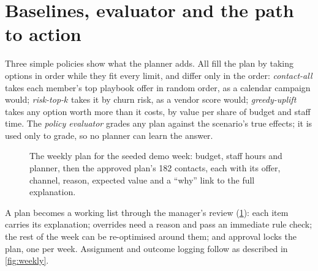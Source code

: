 \section{Baselines, evaluator and the path to action}

Three simple policies show what the planner adds. All fill the plan by taking options in order while they fit every limit, and differ only in the order: \emph{contact-all} takes each member's top playbook offer in random order, as a calendar campaign would; \emph{risk-top-$k$} takes it by churn risk, as a vendor score would; \emph{greedy-uplift} takes any option worth more than it costs, by value per share of budget and staff time. The \emph{policy evaluator} grades any plan against the scenario's true effects; it is used only to grade, so no planner can learn the answer.

\begin{figure}[tb]
  \centering
  \caption{The weekly plan for the seeded demo week: budget, staff hours and planner, then the approved plan's 182 contacts, each with its offer, channel, reason, expected value and a \enquote{why} link to the full explanation.}
  \label{fig:plan}
\end{figure}

A plan becomes a working list through the manager's review (\cref{fig:plan}): each item carries its explanation; overrides need a reason and pass an immediate rule check; the rest of the week can be re-optimised around them; and approval locks the plan, one per week. Assignment and outcome logging follow as described in \cref{fig:weekly}.
